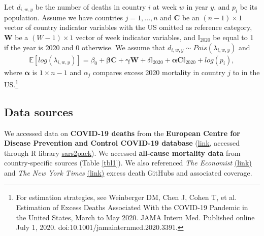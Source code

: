 \documentclass[
]{article}
\begin{document}
Let \(d_{i,w,y}\) be the number of deaths in country \(i\) at week \(w\)
in year \(y\), and \(p_i\) be its population. Assume we have countries
\(j = 1,...,n\) and \(\mathbf{C}\) be an \((n-1) \times 1\) vector of
country indicator variables with the US omitted as reference category,
\(\mathbf{W}\) be a \((W-1) \times 1\) vector of week indicator
variables, and \(\mathbb{I}_{2020}\) be equal to 1 if the year is 2020
and 0 otherwise. We assume that \(d_{i,w,y} \sim Pois(\lambda_{i,w,y})\)
and \begin{align}
\mathbb{E}\left[log(\lambda_{i,w,y})\right] = \beta_0  + \bm{\beta}\mathbf{C} + \bm{\gamma}\mathbf{W} + 
\delta \mathbb{I}_{2020}  + \bm{\alpha}\mathbf{C}\mathbb{I}_{2020}  + log(p_i),
\end{align} where \(\bm{\alpha}\) is \(1 \times n-1\) and \(\alpha_j\)
compares excess 2020 mortality in country \(j\) to in the
US.\footnote{For estimation strategies, see Weinberger DM, Chen J, Cohen T, et al. Estimation of Excess Deaths Associated With the COVID-19 Pandemic in the United States, March to May 2020. JAMA Intern Med. Published online July 1, 2020. doi:10.1001/jamainternmed.2020.3391.}

\bigskip

\hypertarget{data-sources}{%
\subsection{Data sources}\label{data-sources}}

We accessed data on \textbf{COVID-19 deaths} from the
\textbf{European Centre for Disease Prevention and Control COVID-19 database}
(\href{https://www.ecdc.europa.eu/en/publications-data/download-todays-data-geographic-distribution-covid-19-cases-worldwide}{link},
accessed through R library
\href{https://github.com/seandavi/sars2pack}{sars2pack}). We accessed
\textbf{all-cause mortality data} from country-specific sources (Table
\ref{tbl1}). We also referenced \emph{The Economist}
\href{https://github.com/TheEconomist/covid-19-excess-deaths-tracker}{(link)}
and \emph{The New York Times}
\href{https://github.com/nytimes/covid-19-data/tree/master/excess-deaths}{(link)}
excess death GitHubs and associated coverage.
\end{document}
